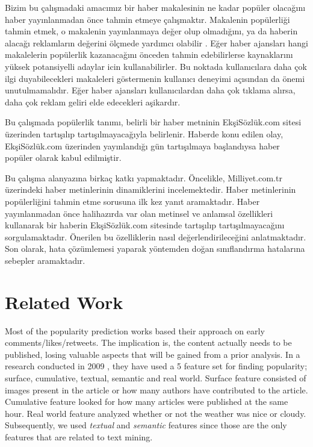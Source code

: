 \documentclass[conference]{IEEEtran}
\begin{document}
Bizim bu çalışmadaki amacımız bir haber makalesinin ne kadar popüler olacağını haber yayınlanmadan önce tahmin etmeye çalışmaktır. Makalenin popülerliği tahmin etmek, o makalenin yayınlanmaya değer olup olmadığını, ya da haberin alacağı reklamların değerini ölçmede yardımcı olabilir \cite{phukan_feasibility_2016}. Eğer haber ajansları hangi makalelerin popülerlik kazanacağını önceden tahmin edebilirlerse kaynaklarını yüksek potansiyelli adaylar icin kullanabilirler. Bu noktada kullanıcılara daha çok ilgi duyabilecekleri makaleleri göstermenin kullanıcı deneyimi açısından da önemi unutulmamalıdır. Eğer haber ajansları kullanıcılardan daha çok tıklama alırsa, daha çok reklam geliri elde edecekleri aşikardır. \cite{bandari_pulse_2012}

Bu çalışmada popülerlik tanımı, belirli bir haber metninin EkşiSözlük.com sitesi üzerinden tartışılıp tartışılmayacağıyla belirlenir. Haberde konu edilen olay, EkşiSözlük.com üzerinden yayınlandığı gün tartışılmaya başlandıysa haber popüler olarak kabul edilmiştir.

Bu çalışma alanyazına birkaç katkı yapmaktadır. Öncelikle, Milliyet.com.tr üzerindeki haber metinlerinin dinamiklerini incelemektedir. Haber metinlerinin popülerliğini tahmin etme sorusuna ilk kez yanıt aramaktadır. Haber yayınlanmadan önce halihazırda var olan metinsel ve anlamsal özellikleri kullanarak bir haberin EkşiSözlük.com sitesinde tartışılıp tartışılmayacağını sorgulamaktadır. Önerilen bu özelliklerin nasıl değerlendirileceğini anlatmaktadır. Son olarak, hata çözümlemesi yaparak yöntemden doğan sınıflandırma hatalarına sebepler aramaktadır.

 
\section{Related Work}
Most of the popularity prediction works based their approach on early comments/likes/retweets. \cite{szabo_predicting_2010} The implication is, the content actually needs to be published, losing valuable aspects that will be gained from a prior analysis.
In a research conducted in 2009 \cite{tsagkias_predicting_2009}, they have used a 5 feature set for finding popularity; surface, cumulative, textual, semantic and real world. Surface feature consisted of images present in the article or how many authors have contributed to the article. Cumulative feature looked for how many articles were published at the same hour. Real world feature analyzed whether or not the weather was nice or cloudy. Subsequently, we used \emph{textual} and \emph{semantic} features since those are the only features that are related to text mining.
\end{document}
